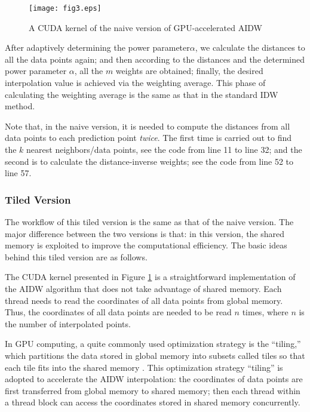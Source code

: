 \documentclass[fleqn,11pt]{wlscirep}
\begin{document}
\begin{figure}[htbp]
	\centering
	\texttt{[image: fig3.eps]}
	\caption{A CUDA kernel of the naive version of GPU-accelerated AIDW}
	\label{fig3:CUDA Kernel}
\end{figure}

After adaptively determining the power parameter$\alpha $, we calculate the 
distances to all the data points again; and then according to the distances 
and the determined power parameter $\alpha $, all the $m$ weights are obtained; 
finally, the desired interpolation value is achieved via the weighting 
average. This phase of calculating the weighting average is the same as that 
in the standard IDW method.

Note that, in the naive version, it is needed to compute the distances from 
all data points to each prediction point \textit{twice}. The first time is carried out to 
find the $k $ nearest neighbors/data points, see the code from line 11 to line 
32; and the second is to calculate the distance-inverse weights; see the 
code from line 52 to line 57. 

\subsubsection{Tiled Version}

The workflow of this tiled version is the same as that of the naive version. 
The major difference between the two versions is that: in this version, the 
shared memory is exploited to improve the computational efficiency. The 
basic ideas behind this tiled version are as follows.

The CUDA kernel presented in Figure \ref{fig3:CUDA Kernel} is a straightforward implementation of 
the AIDW algorithm that does not take advantage of shared memory. Each 
thread needs to read the coordinates of all data points from global memory. 
Thus, the coordinates of all data points are needed to be read $n$ times, where 
$n$ is the number of interpolated points.

In GPU computing, a quite commonly used optimization strategy is the 
``tiling,'' which partitions the data stored in global memory into subsets 
called tiles so that each tile fits into the shared memory \cite{14}. This 
optimization strategy ``tiling'' is adopted to accelerate the AIDW 
interpolation: the coordinates of data points are first transferred from 
global memory to shared memory; then each thread within a thread block can 
access the coordinates stored in shared memory concurrently. 
\end{document}
